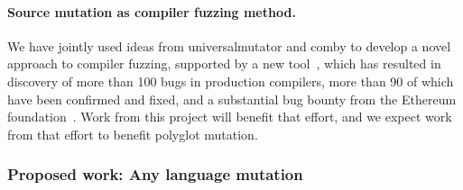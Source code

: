 \paragraph{Source mutation as compiler fuzzing method.}  We have jointly used ideas from universalmutator and comby to develop
a novel approach to compiler fuzzing, supported by a new tool~\cite{aflcompfuzz}, which has resulted in
discovery of more than 100 bugs in production compilers, more than 90
of which have been confirmed and fixed, and a
substantial bug bounty from the Ethereum foundation~\cite{tobsolcfuzz1,tobsolcfuzz2}.  Work from this
project will benefit that effort, and we expect work from that effort
to benefit polyglot mutation.

\subsubsection{Proposed work: Any language mutation}
\label{subsubsection:any-language}

